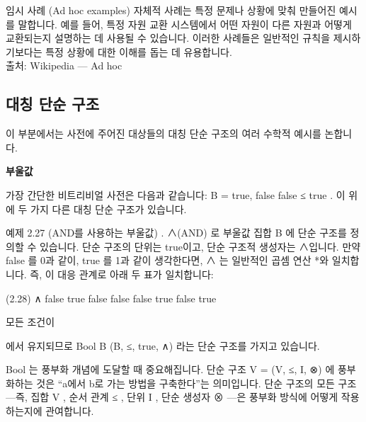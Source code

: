 \documentclass[11pt, a4paper, twoside, openany]{book}
\begin{document}
{\begin{deepresearch}{임시 사례 (Ad hoc examples)}
자체적 사례는 특정 문제나 상황에 맞춰 만들어진 예시를 말합니다.  예를 들어, 특정 자원 교환 시스템에서 어떤 자원이 다른 자원과 어떻게 교환되는지 설명하는 데 사용될 수 있습니다. 이러한 사례들은 일반적인 규칙을 제시하기보다는 특정 상황에 대한 이해를 돕는 데 유용합니다.
\\[4pt]{\footnotesize\color{ctgray} 출처: Wikipedia — Ad hoc}
\end{deepresearch}


\subsection{대칭 단순 구조}
\label{sec:2-2-4}

이 부분에서는 사전에 주어진 대상들의 대칭 단순 구조의 여러 수학적 예시를 논합니다.

\par\medskip
\textbf{부울값}

\par\medskip
가장 간단한 비트리비얼 사전은 다음과 같습니다: B = {true, false}
false ≤ true . 이 위에 두 가지 다른 대칭 단순 구조가 있습니다.

\par\medskip
예제 2.27 (AND\hspace{0pt}를 사용하는 부울값) .  ∧(AND) 로 부울값 집합 B 에 단순 구조를 정의할 수 있습니다. 단순 구조의 단위는 true\hspace{0pt}이고, 단순 구조적 생성자는 ∧입니다. 만약 false 를 0\hspace{0pt}과 같이, true 를 1\hspace{0pt}과 같이 생각한다면, ∧ 는 일반적인 곱셈 연산 *와 일치합니다. 즉, 이 대응 관계로 아래 두 표가 일치합니다:

\par\medskip
(2.28)
∧
false
true
false
false
false
true
false
true

\par\medskip
모든 조건이 
\begin{definitionbox}[정의 2.2]
에서 유지되므로 Bool B (B, ≤, true, ∧) 라는 단순 구조를 가지고 있습니다.
\end{definitionbox}

\par\medskip
Bool 는 풍부화 개념에 도달할 때 중요해집니다. 단순 구조 V = (V, ≤, I, ⊗) 에 풍부화하는 것은 “a\hspace{0pt}에서 b\hspace{0pt}로 가는 방법을 구축한다”는 의미입니다. 단순 구조의 모든 구조—즉, 집합 V , 순서 관계 ≤ , 단위 I , 단순 생성자 ⊗ —은 풍부화 방식에 어떻게 작용하는지에 관여합니다.

}
\end{document}
